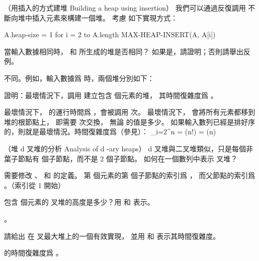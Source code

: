 \startsubject[
  title={Problems},
]

\startPROBLEM
（用插入的方式建堆 Building a heap using insertion）
我們可以通過反復調用  不斷向堆中插入元素來構建一個堆。
考慮  如下實現方式：

\startCLRS
A.heap-size = 1
for i = 2 to A.length
	MAX-HEAP-INSERT(A, A[i])
\stopCLRS

\startigBase[a]
\startitem
當輸入數據相同時，  和  所生成的堆是否相同？
如果是，請證明；否則請舉出反例。

\startANSWER
不同。例如，輸入數據爲  時，兩個堆分別如下：

\startcombination[2*1]
{\externalfigure[output/p6_1_a-1]}{}
{\externalfigure[output/p6_1_a-2]}{}
\stopcombination

\stopANSWER
\stopitem
\startitem
證明：最壞情況下，調用  建立包含  個元素的堆，
其時間復雜度爲 。

\startANSWER
最壞情況下，  的運行時間爲 ，會被調用  次。
最壞情況下，  會將所有元素都移到堆的根節點上， 即需要  次交換，
無論  的值是多少。
如果輸入數列已經是排好序的，則就是最壞情況。時間復雜度爲（參見）：
\startformula
\sum_{i=2}^{n} = \lg(n!) = \Theta(n)
\stopformula
\stopANSWER
\stopitem
\stopigBase
\stopPROBLEM

\startPROBLEM[problem:6-2]
（堆 d 叉堆的分析 Analysis of d -ary heaps）
d 叉堆與二叉堆類似，只是每個非葉子節點有  個子節點，而不是 2 個子節點。
\startigBase[a]
\startitem
如何在一個數列中表示  叉堆？

\startANSWER
需要修改 、  和  的定義。
第  個元素的第  個子節點的索引爲 ，
而父節點的索引爲 。（索引從 1 開始）
\stopANSWER
\stopitem

\startitem
包含  個元素的  叉堆的高度是多少？用  和  表示。

\startANSWER
{}。
\stopANSWER
\stopitem

\startitem
請給出  在  叉最大堆上的一個有效實現，
並用  和  表示其時間復雜度。

\startANSWER
{} 的時間復雜度爲 。
\stopANSWER
\stopitem

